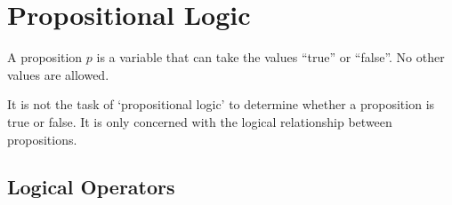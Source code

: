 
\section{Propositional Logic}
\begin{definition}[Proposition]
	A proposition \(p\) is a variable that can take the values ``true'' or ``false''. No other values are allowed.
\end{definition}
It is not the task of `propositional logic' to determine whether a proposition is true or false. It is only concerned with the logical relationship between propositions.

\noindent{}

\subsection{Logical Operators}

